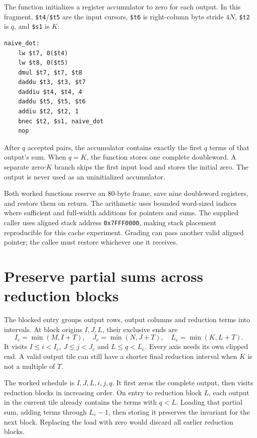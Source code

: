 The function initializes a register accumulator to zero for each output. In this
fragment, \texttt{\$t4}/\texttt{\$t5} are the input cursors,
\texttt{\$t6} is right-column byte stride $4N$, \texttt{\$t2} is $q$, and
\texttt{\$s1} is $K$:

\noindent\begin{minipage}{\linewidth}
  \begin{verbatim}
naive_dot:
    lw $t7, 0($t4)
    lw $t8, 0($t5)
    dmul $t7, $t7, $t8
    daddu $t3, $t3, $t7
    daddiu $t4, $t4, 4
    daddu $t5, $t5, $t6
    addiu $t2, $t2, 1
    bnec $t2, $s1, naive_dot
    nop
\end{verbatim}
\end{minipage}

After $q$ accepted pairs, the accumulator contains exactly the first $q$ terms
of that output's sum. When $q=K$, the function stores one complete doubleword.
A separate zero-$K$ branch skips the first input load and stores the initial zero.
The output is never used as an uninitialized accumulator.

Both worked functions reserve an 80-byte frame, save nine doubleword registers,
and restore them on return. The arithmetic uses bounded word-sized indices where
sufficient and full-width additions for pointers and sums. The supplied caller
uses aligned stack address \texttt{0x7FFF0000}, making stack placement reproducible
for this cache experiment. Grading can pass another valid aligned pointer; the
callee must restore whichever one it receives.

\section{Preserve partial sums across reduction blocks}

The blocked entry groups output rows, output columns and reduction terms into
intervals. At block origins $I,J,L$, their exclusive ends are
\[
  I_e=\min(M,I+T),\quad J_e=\min(N,J+T),\quad L_e=\min(K,L+T).
\]
It visits $I\leq i<I_e$, $J\leq j<J_e$ and $L\leq q<L_e$. Every axis needs its
own clipped end. A valid output tile can still have a shorter final reduction
interval when $K$ is not a multiple of $T$.

The worked schedule is $I,J,L,i,j,q$. It first zeros the complete output, then
visits reduction blocks in increasing order. On entry to reduction block $L$,
each output in the current tile already contains the terms with $q<L$. Loading
that partial sum, adding terms through $L_e-1$, then storing it preserves the
invariant for the next block. Replacing the load with zero would discard all
earlier reduction blocks.

